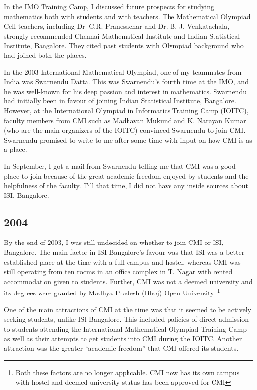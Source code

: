 \documentclass[a4paper]{amsart}
\begin{document}
In the IMO Training Camp, I discussed future prospects for studying
mathematics both with students and with teachers. The Mathematical
Olympiad Cell teachers, including Dr. C.R. Pranesachar and
Dr. B. J. Venkatachala, strongly recommended Chennai Mathematical
Institute and Indian Statistical Institute, Bangalore. They cited past students
with Olympiad background who had joined both the places.

In the 2003 International Mathematical Olympiad, one of my teammates
from India was Swarnendu Datta. This was Swarnendu's fourth time at
the IMO, and he was well-known for his deep passion and interest in
mathematics. Swarnendu had initially been in favour of joining Indian
Statistical Institute, Bangalore. However, at the International
Olympiad in Informatics Training Camp (IOITC), faculty members from
CMI such as Madhavan Mukund and K. Narayan Kumar (who are the main organizers of the IOITC)
convinced Swarnendu to join CMI. Swarnendu promised to write to me after some time
with input on how CMI is as a place.

In September, I got a mail from Swarnendu telling me that CMI was a
good place to join because of the great academic freedom enjoyed by
students and the helpfulness of the faculty. Till that time, I did not have any inside sources about
ISI, Bangalore.

\subsection{2004}

By the end of 2003, I was still undecided on whether to join CMI or ISI, Bangalore. The main factor
in ISI Bangalore's favour was that ISI was a better established place at the time with a full campus and hostel,
whereas CMI was still operating from ten rooms in an office complex in T. Nagar with rented accommodation given
to students. Further, CMI was not a deemed university and its degrees were granted by Madhya Pradesh (Bhoj) Open University.
\footnote{Both these factors are no longer applicable. CMI now has its own campus with hostel and deemed university status has been
  approved for CMI}

One of the main attractions of CMI at the time was that it seemed to
be actively seeking students, unlike ISI Bangalore. This included
policies of direct admission to students attending the International
Mathematical Olympiad Training Camp as well as their attempts to get
students into CMI during the IOITC. Another attraction was the greater
``academic freedom'' that CMI offered its students.
\end{document}

